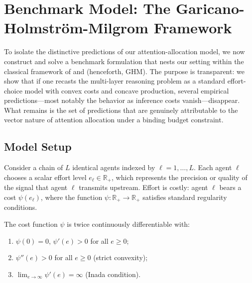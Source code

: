 

\section{Benchmark Model: The Garicano-Holmstr\"om-Milgrom Framework}
\label{sec:GHM_benchmark}

To isolate the distinctive predictions of our attention-allocation model, we now construct and solve a benchmark formulation that nests our setting within the classical framework of \citet{garicano2000hierarchies} and \citet{holmstrom1991multitask} (henceforth, GHM). The purpose is transparent: we show that if one recasts the multi-layer reasoning problem as a standard effort-choice model with convex costs and concave production, several empirical predictions---most notably the behavior as inference costs vanish---disappear. What remains is the set of predictions that are genuinely attributable to the vector nature of attention allocation under a binding budget constraint.

\subsection{Model Setup}

Consider a chain of $L$ identical agents indexed by $\ell = 1, \dots, L$. Each agent $\ell$ chooses a scalar effort level $e_\ell \in \mathbb{R}_+$, which represents the precision or quality of the signal that agent $\ell$ transmits upstream. Effort is costly: agent $\ell$ bears a cost $\psi(e_\ell)$, where the function $\psi: \mathbb{R}_+ \to \mathbb{R}_+$ satisfies standard regularity conditions.

\begin{assumption}
\label{ass:GHM_cost}
The cost function $\psi$ is twice continuously differentiable with:
\begin{enumerate}[label=(\roman*)]
    \item $\psi(0) = 0$, $\psi'(e) > 0$ for all $e \geq 0$;
    \item $\psi''(e) > 0$ for all $e \geq 0$ (strict convexity);
    \item $\lim_{e \to \infty} \psi'(e) = \infty$ (Inada condition).
\end{enumerate}
\end{assumption}

